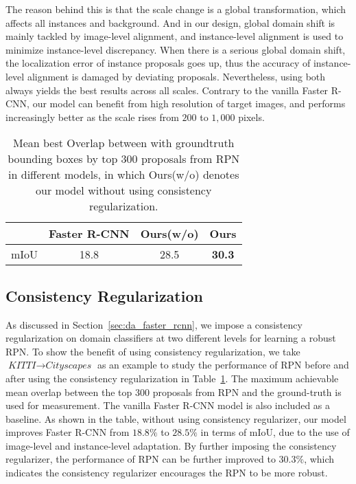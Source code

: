\documentclass[10pt,twocolumn,letterpaper]{article}
\def\cs{\textit{Cityscapes} }
\def\kitti{\textit{KITTI} }
\begin{document}
The reason behind this is that the scale change is a global transformation, which affects all instances and background. And in our design, global domain shift is mainly tackled by image-level alignment, and instance-level alignment is used to minimize instance-level discrepancy. When there is a serious global domain shift, the localization error of instance proposals goes up, thus the accuracy of instance-level alignment is damaged by deviating proposals. Nevertheless, using both always yields the best results across all scales. Contrary to the vanilla Faster R-CNN, our model can benefit from high resolution of target images, and performs increasingly better as the scale rises from $200$ to $1,000$ pixels.  

\begin{table}
\center
\begin{tabular}{c| c| c | c}
  \hline
  & Faster R-CNN &  Ours(w/o) & Ours \\ \hline \hline
  mIoU & 18.8 & 28.5 & \bf{30.3}\\ \hline
\end{tabular}
\vspace{3mm}
\caption{Mean best Overlap between with groundtruth bounding boxes by top 300 proposals from RPN in different models, in which Ours(w/o) denotes our model without using consistency regularization.}
\vspace{-3mm}

\label{tab:consistency}
\end{table}

\subsection{Consistency Regularization}
As discussed in Section~\ref{sec:da_faster_rcnn}, we impose a consistency regularization on domain classifiers at two different levels for learning a robust RPN. To show the benefit of using consistency regularization, we take $\kitti \rightarrow \cs$ as an example to study the performance of RPN before and after using the consistency regularization in Table~\ref{tab:consistency}. The maximum  achievable mean overlap between the top 300 proposals from RPN and the ground-truth is used for measurement. The vanilla Faster R-CNN model is also included as a baseline. As shown in the table, without using consistency regularizer, our model improves Faster R-CNN from $18.8\%$ to $28.5\%$ in terms of mIoU, due to the use of image-level and instance-level adaptation. By further imposing the consistency regularizer, the performance of RPN can be further improved to $30.3\%$, which indicates the consistency regularizer encourages the RPN to be more robust. 
\end{document}
